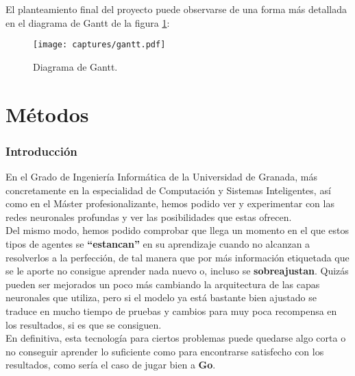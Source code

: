 \documentclass[11pt,fleqn]{book} %
\begin{document}
El planteamiento final del proyecto puede observarse de una forma más detallada en el diagrama de Gantt de la figura \ref{fig:gantt}:

\begin{figure}[H]
	\centering\texttt{[image: captures/gantt.pdf]}
	\caption{Diagrama de Gantt.}
	\label{fig:gantt} %
\end{figure}


\part{Métodos}

\section*{Introducción}

En el Grado de Ingeniería Informática de la Universidad de Granada, más concretamente en la especialidad de Computación y Sistemas Inteligentes, así como en el Máster profesionalizante, hemos podido ver y experimentar con las redes neuronales profundas y ver las posibilidades que estas ofrecen. \\

Del mismo modo, hemos podido comprobar que llega un momento en el que estos tipos de agentes se \textbf{``estancan''} en su aprendizaje cuando no alcanzan a resolverlos a la perfección, de tal manera que por más información etiquetada que se le aporte no consigue aprender nada nuevo o, incluso se \textbf{sobreajustan}. Quizás pueden ser mejorados un poco más cambiando la arquitectura de las capas neuronales que utiliza, pero si el modelo ya está bastante bien ajustado se traduce en mucho tiempo de pruebas y cambios para muy poca recompensa en los resultados, si es que se consiguen. \\

En definitiva, esta tecnología para ciertos problemas puede quedarse algo corta o no conseguir aprender lo suficiente como para encontrarse satisfecho con los resultados, como sería el caso de jugar bien a \textbf{Go}.\cite{article:go} \\
\end{document}
